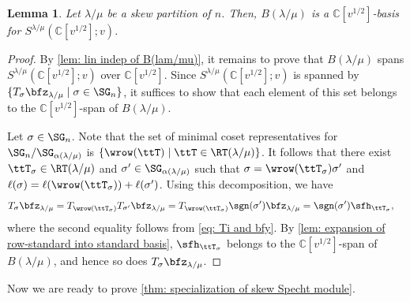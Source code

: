 \documentclass[12pt, reqno]{amsart}
\theoremstyle{plain}
\newtheorem{lemma}[lemma]{Lemma}
\theoremstyle{definition}
\numberwithin{equation}{section}
\numberwithin{figure}{section}
\numberwithin{table}{section}
\def\C{\mathbb C}
\begin{document}
\begin{lemma}\label{lem: skew specht basis}
Let $\lambda/\mu$ be a skew partition of  $n$.
Then, $B(\lambda/\mu)$ is a $\C[v^{1/2}]$-basis for $S^{\lambda/\mu}(\C[v^{1/2}];v)$.
\end{lemma}


\begin{proof}
By \cref{lem: lin indep of B(lam/mu)}, it remains to prove that
$B(\lambda/\mu)$ spans
$S^{\lambda/\mu}(\C[v^{1/2}];v)$ over $\C[v^{1/2}]$.
Since $S^{\lambda/\mu}(\C[v^{1/2}];v)$ is 
spanned by $\{T_\sigma\bfz_{\lambda/\mu} \mid \sigma\in\SG_n\}$,
it suffices to show that each element of this set belongs to the
$\C[v^{1/2}]$-span of $B(\lambda/\mu)$.

Let $\sigma \in \SG_n$.
Note that the set of minimal coset representatives for
$\SG_n/\SG_{\alpha(\lambda/\mu)}$ is $\{\wrow(\ttT) \mid \ttT \in \RT(\lambda/\mu) \}$.
It follows that there exist $\ttT_\sigma \in \RT(\lambda/\mu)$ and $\sigma' \in \SG_{\alpha(\lambda/\mu)}$ such that $\sigma = \wrow(\ttT_\sigma)  \sigma'$ and $\ell(\sigma) = \ell(\wrow(\ttT_\sigma)) +  \ell(\sigma')$.
Using this decomposition, we have
\begin{align*}
T_\sigma \bfz_{\lambda/\mu} & = T_{\wrow(\ttT_\sigma)} T_{\sigma'} \bfz_{\lambda/\mu} =T_{\wrow(\ttT_\sigma)} \sgn(\sigma') \bfz_{\lambda/\mu} = \sgn(\sigma') \sfh_{\ttT_\sigma},
\end{align*}
where the second equality follows from \cref{eq: Ti and bfy}.
By \cref{lem: expansion of row-standard into standard basis},
$\sfh_{\ttT_\sigma}$ belongs to the $\C[v^{1/2}]$-span of
$B(\lambda/\mu)$, and hence so does $T_\sigma\bfz_{\lambda/\mu}$.
\end{proof}



Now we are ready to prove  \cref{thm: specialization of skew Specht module}.
\end{document}
